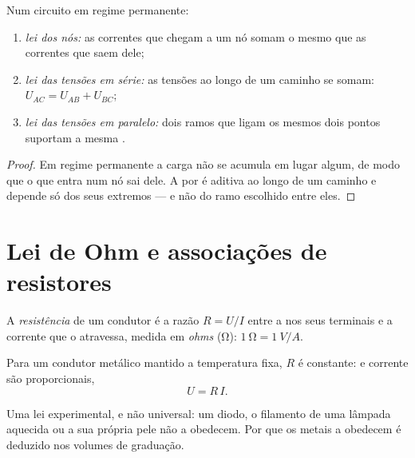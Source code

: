\begin{proposition}\label{prop:g11:circuits-and-power:laws}
Num circuito em regime permanente:
\begin{enumerate}
  \item \emph{lei dos nós:} as correntes que chegam a um nó somam o mesmo
        que as correntes que saem dele;
  \item \emph{lei das tensões em série:} as tensões ao longo de um
        caminho se somam: $U_{AC} = U_{AB} + U_{BC}$;
  \item \emph{lei das tensões em paralelo:} dois ramos que ligam os
        mesmos dois pontos suportam a mesma .
\end{enumerate}
\end{proposition}

\begin{proof}
Em regime permanente a carga não se acumula em lugar algum, de modo que o
que entra num nó sai dele. A  por  é aditiva ao longo de um
caminho e depende só dos seus extremos --- e não do ramo escolhido entre
eles.
\end{proof}

\section{Lei de Ohm e associações de resistores}

\begin{definition}[Resistência]\label{def:g11:circuits-and-power:resistance}
A \emph{resistência} de um condutor é a razão
$R = U/I$ entre a  nos seus terminais e a corrente que o atravessa,
medida em \emph{ohms} (\unit{\ohm}):
$\qty{1}{\ohm} = \qty{1}{V/A}$.
\end{definition}

\begin{proposition}\label{prop:g11:circuits-and-power:ohm}
Para um condutor metálico mantido a temperatura fixa, $R$ é constante:
 e corrente são proporcionais,
\[ U = R\,I . \]
\end{proposition}
\admitted

\begin{remark}\label{rem:g11:circuits-and-power:ohm-limits}
Uma lei experimental, e não universal: um diodo, o filamento de uma
lâmpada aquecida ou a sua própria pele não a obedecem. Por que os metais
a obedecem é deduzido nos volumes de graduação.
\end{remark}

